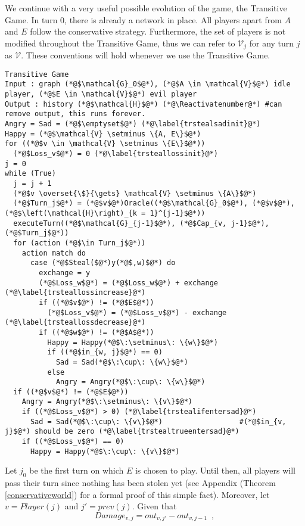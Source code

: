 \documentclass[11pt]{llncs}
\makeatletter
\newcommand*\Suppressnumber{%
  \lst@AddToHook{OnNewLine}{%
    \let\thelstnumber\relax%
     \advance\c@lstnumber-\@ne\relax%
    }%
}
\theoremstyle{definition}
\makeatother
\begin{document}
     We continue with a very useful possible evolution of the game, the Transitive Game. In turn 0, there is already a network
     in place. All players apart from $A$ and $E$ follow the conservative strategy. Furthermore, the set of players is not
     modified throughout the Transitive Game, thus we can refer to $\mathcal{V}_j$ for any turn $j$ as $\mathcal{V}$. These
     conventions will hold whenever we use the Transitive Game.
     \Suppressnumber
     \begin{lstlisting}[label=transitivegame, style=numbers]
Transitive Game
Input : graph (*@$\mathcal{G}_0$@*), (*@$A \in \mathcal{V}$@*) idle player, (*@$E \in \mathcal{V}$@*) evil player
Output : history (*@$\mathcal{H}$@*) (*@\Reactivatenumber@*) #can remove output, this runs forever.
Angry = Sad = (*@$\emptyset$@*) (*@\label{trstealsadinit}@*)
Happy = (*@$\mathcal{V} \setminus \{A, E\}$@*)
for ((*@$v \in \mathcal{V} \setminus \{E\}$@*))
  (*@$Loss_v$@*) = 0 (*@\label{trsteallossinit}@*)
j = 0
while (True)
  j = j + 1
  (*@$v \overset{\$}{\gets} \mathcal{V} \setminus \{A\}$@*)
  (*@$Turn_j$@*) = (*@$v$@*)Oracle((*@$\mathcal{G}_0$@*), (*@$v$@*), (*@$\left(\mathcal{H}\right)_{k = 1}^{j-1}$@*))
  executeTurn((*@$\mathcal{G}_{j-1}$@*), (*@$Cap_{v, j-1}$@*), (*@$Turn_j$@*))
  for (action (*@$\in Turn_j$@*))
    action match do
      case (*@$Steal($@*)y(*@$,w)$@*) do
        exchange = y
        (*@$Loss_w$@*) = (*@$Loss_w$@*) + exchange (*@\label{trsteallossincrease}@*)
        if ((*@$v$@*) != (*@$E$@*))
          (*@$Loss_v$@*) = (*@$Loss_v$@*) - exchange (*@\label{trsteallossdecrease}@*)
        if ((*@$w$@*) != (*@$A$@*))
          Happy = Happy(*@$\:\setminus\: \{w\}$@*)
          if ((*@$in_{w, j}$@*) == 0)
            Sad = Sad(*@$\:\cup\: \{w\}$@*)
          else
            Angry = Angry(*@$\:\cup\: \{w\}$@*)
  if ((*@$v$@*) != (*@$E$@*))
    Angry = Angry(*@$\:\setminus\: \{v\}$@*)
    if ((*@$Loss_v$@*) > 0) (*@\label{trstealifentersad}@*) 
      Sad = Sad(*@$\:\cup\: \{v\}$@*)                  #(*@$in_{v, j}$@*) should be zero (*@\label{trstealtrueentersad}@*)
    if ((*@$Loss_v$@*) == 0)
      Happy = Happy(*@$\:\cup\: \{v\}$@*)
     \end{lstlisting}
     Let $j_0$ be the first turn on which $E$ is chosen to play. Until then, all players will pass their turn since nothing
     has been stolen yet (see Appendix (Theorem \ref{conservativeworld}) for a formal proof of this simple fact). Moreover,
     let $v = Player(j)$ and $j' = prev\left(j\right)$. Given that
     \begin{equation}
        Damage_{v,j} = out_{v, j'} - out_{v, j-1} \enspace,
     \end{equation}
\end{document}
